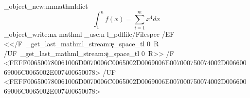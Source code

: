 \documentclass{article}
\begin{document}
\ExplSyntaxOn
\pdf_object_new:nn{mathml}{dict}
\ExplSyntaxOff
{}
\[
  \int_1^n f(x) = \sum_{i=1}^m x^4 dx
\]
\ExplSyntaxOn
\edef\blub{\luamml_get_last_mathml_stream:e{}}
\pdf_object_write:nx { mathml }
            {
              \pdfdict_use:n { l_pdffile/Filespec}
              /EF <</F~\blub\c_space_tl 0~R /UF~\blub \c_space_tl 0~R>>
              /F <FEFF006500780061006D0070006C0065002D0069006E007000750074002D00660069006C0065002E007400650078> /UF <FEFF006500780061006D0070006C0065002D0069006E007000750074002D00660069006C0065002E007400650078>
            }
\ExplSyntaxOff

\tagmcend
\tagstructend
\tagstructend
\end{document}
